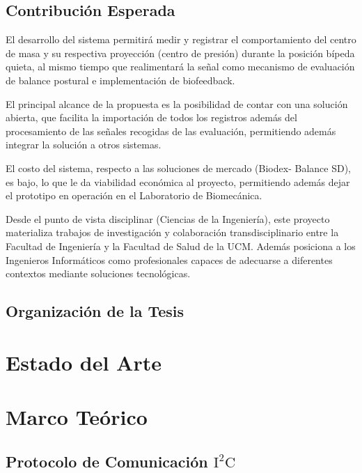 \documentclass[12pt,a4paper]{article}
\begin{document}
\subsection{Contribución Esperada}

El desarrollo del sistema permitirá medir y registrar el comportamiento del centro de masa y su respectiva proyección (centro de presión) durante la posición bípeda quieta, al mismo tiempo que realimentará la señal como mecanismo de evaluación de balance postural e implementación de biofeedback.

El principal alcance de la propuesta es la posibilidad de contar con una solución abierta, que facilita la importación de todos los registros además del procesamiento de las señales recogidas de las evaluación, permitiendo además integrar la solución a otros sistemas.
 
El costo del sistema, respecto a las soluciones de mercado (Biodex- Balance SD), es bajo, lo que le da viabilidad económica al proyecto, permitiendo además dejar el prototipo en operación en el Laboratorio de Biomecánica. 

Desde el punto de vista disciplinar (Ciencias de la Ingeniería), este proyecto materializa trabajos de investigación y colaboración transdisciplinario entre la Facultad de Ingeniería y la Facultad de Salud de la UCM. Además posiciona a los Ingenieros Informáticos como profesionales capaces de adecuarse a diferentes contextos mediante soluciones tecnológicas.

\subsection{Organización de la Tesis}
\section{Estado del Arte}
\section{Marco Teórico}
 
\subsection{Protocolo de Comunicación $\mathbf{\mathrm{I^2C}}$}
\end{document}
